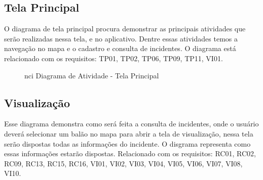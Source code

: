 \documentclass[12pt]{article}
\begin{document}
\vfill%
\pagebreak%

\subsection{Tela Principal}

O diagrama de tela principal procura demonstrar as principais atividades que serão realizadas nessa tela, e no aplicativo. Dentre essas atividades temos a navegação no mapa e o cadastro e consulta de incidentes. O diagrama está relacionado com os requisitos: TP01, TP02, TP06, TP09, TP11, VI01.

  \begin{figure}[!htb]
    \caption{\label{fig:diagTelaPr}nci Diagrama de Atividade - Tela Principal}
  \end{figure}

\vfill%
\pagebreak%

\subsection{Visualização}

Esse diagrama demonstra como será feita a consulta de incidentes, onde o usuário deverá selecionar um balão no mapa para abrir a tela de visualização, nessa tela serão dispostas todas as informações do incidente. O disgrama representa como essas informações estarão dispostas. Relacionado com os requisitos: RC01, RC02, RC09, RC13, RC15, RC16, VI01, VI02, VI03, VI04, VI05, VI06, VI07, VI08, VI10.
\end{document}
